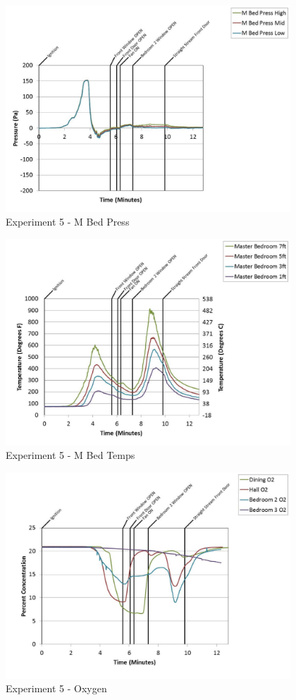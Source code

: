 \documentclass{article}
\begin{document}
\begin{appendices}
	\begin{figure}[h!]
		\centering
		\includegraphics[height=3.05in]{0_Images/Results_Charts/Exp_5_Charts/MBedPress.pdf}
		\caption{Experiment 5 - M Bed Press}
	\end{figure}
 
	\clearpage

	\begin{figure}[h!]
		\centering
		\includegraphics[height=3.05in]{0_Images/Results_Charts/Exp_5_Charts/MBedTemps.pdf}
		\caption{Experiment 5 - M Bed Temps}
	\end{figure}
 

	\begin{figure}[h!]
		\centering
		\includegraphics[height=3.05in]{0_Images/Results_Charts/Exp_5_Charts/Oxygen.pdf}
		\caption{Experiment 5 - Oxygen}
	\end{figure}
 

\end{appendices}
\end{document}
